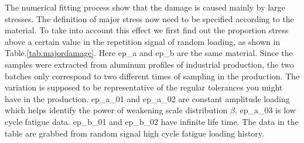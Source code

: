 \documentclass[3p,times,number,review]{elsarticle}
\begin{document}
The numerical fitting process show that the damage is caused mainly by large stresses. The definition of major stress now need to be specified according to the material. To take into account this effect we first find out the proportion stress above a certain value in the repetition signal of random loading, as shown in Table.\ref{tab.majordamage}.  Here ep\_a and ep\_b are the same material. Since the samples were extracted from aluminum profiles of industrial production,  the two batches only  correspond to two different times of sampling in the production. The variation is supposed to be representative of the regular tolerances you might have in the production. ep\_a\_01 and ep\_a\_02 are constant amplitude loading which helps identify the power of weakening scale distribution $\beta$. ep\_a\_03 is low cycle fatigue data.  ep\_b\_01 and ep\_b\_02 have infinite life time. The data in the table are grabbed from random signal high cycle fatigue loading history.
\end{document}
